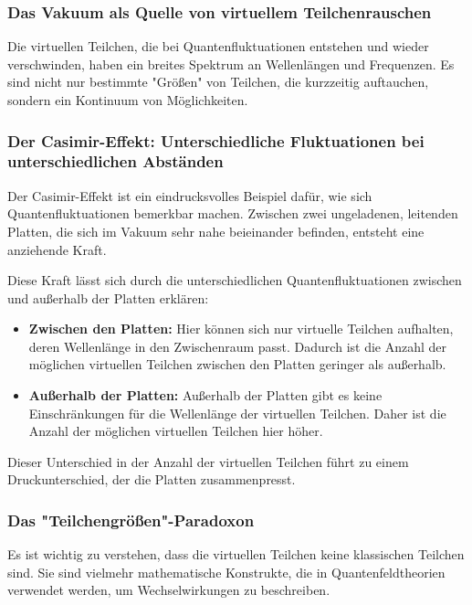 \documentclass{article}
\begin{document}
\subsubsection{Das Vakuum als Quelle von virtuellem Teilchenrauschen}

Die virtuellen Teilchen, die bei Quantenfluktuationen entstehen und wieder verschwinden, haben ein breites Spektrum an Wellenlängen und Frequenzen. Es sind nicht nur bestimmte "Größen" von Teilchen, die kurzzeitig auftauchen, sondern ein Kontinuum von Möglichkeiten.

\subsubsection{Der Casimir-Effekt: Unterschiedliche Fluktuationen bei unterschiedlichen Abständen}

Der Casimir-Effekt ist ein eindrucksvolles Beispiel dafür, wie sich Quantenfluktuationen bemerkbar machen. Zwischen zwei ungeladenen, leitenden Platten, die sich im Vakuum sehr nahe beieinander befinden, entsteht eine anziehende Kraft.

Diese Kraft lässt sich durch die unterschiedlichen Quantenfluktuationen zwischen und außerhalb der Platten erklären:

\begin{itemize}
	\item \textbf{Zwischen den Platten:} Hier können sich nur virtuelle Teilchen aufhalten, deren Wellenlänge in den Zwischenraum passt. Dadurch ist die Anzahl der möglichen virtuellen Teilchen zwischen den Platten geringer als außerhalb.
	\item \textbf{Außerhalb der Platten:} Außerhalb der Platten gibt es keine Einschränkungen für die Wellenlänge der virtuellen Teilchen. Daher ist die Anzahl der möglichen virtuellen Teilchen hier höher.
\end{itemize}

Dieser Unterschied in der Anzahl der virtuellen Teilchen führt zu einem Druckunterschied, der die Platten zusammenpresst.

\subsubsection{Das "Teilchengrößen"-Paradoxon}

Es ist wichtig zu verstehen, dass die virtuellen Teilchen keine klassischen Teilchen sind. Sie sind vielmehr mathematische Konstrukte, die in Quantenfeldtheorien verwendet werden, um Wechselwirkungen zu beschreiben.
\end{document}
